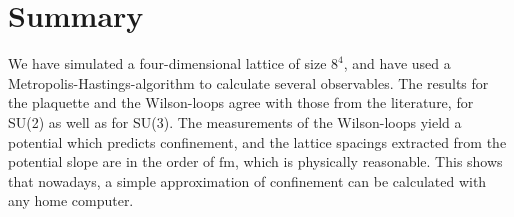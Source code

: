 \documentclass[%
 reprint,
 amsmath,amssymb,
 aps,
]{revtex4-1}
\begin{document}
%
%

\section{Summary}

We have simulated a four-dimensional lattice of size $8^4$, and have used a Metropolis-Hastings-algorithm to calculate several observables. The results for the plaquette and the Wilson-loops agree with those from the literature, for SU(2) as well as for SU(3). The measurements of the Wilson-loops yield a potential which predicts confinement, and the lattice spacings extracted from the potential slope are in the order of $\si{\femto\meter}$, which is physically reasonable. This shows that nowadays, a simple approximation of confinement can be calculated with any home computer. 





\end{document}

